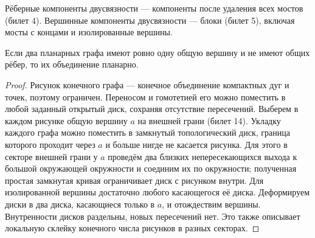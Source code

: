 \begingroup
\setlength{\parskip}{2pt}
\begin{definition}
Рёберные компоненты двусвязности — компоненты после удаления всех мостов
(билет 4). Вершинные компоненты двусвязности — блоки (билет 5), включая
мосты с концами и изолированные вершины.
\end{definition}
\begin{lemma}
Если два планарных графа имеют ровно одну общую вершину и не имеют
общих рёбер, то их объединение планарно.
\end{lemma}
\begin{proof}
Рисунок конечного графа — конечное объединение компактных дуг и точек,
поэтому ограничен. Переносом и гомотетией его можно поместить в любой
заданный открытый диск, сохраняя отсутствие пересечений.
Выберем в каждом рисунке общую вершину \(a\) на внешней грани
(билет 14). Укладку каждого графа можно поместить в замкнутый
топологический диск, граница которого проходит через \(a\) и больше
нигде не касается рисунка. Для этого в секторе внешней грани у \(a\)
проведём два близких непересекающихся выхода к большой окружающей
окружности и соединим их по окружности; полученная простая замкнутая
кривая ограничивает диск с рисунком внутри. Для изолированной вершины
достаточно любого касающегося её диска.
Деформируем диски в два диска, касающиеся только в \(a\), и отождествим
вершины. Внутренности дисков раздельны, новых пересечений нет.
Это также описывает локальную склейку конечного числа рисунков в разных секторах.
\end{proof}


